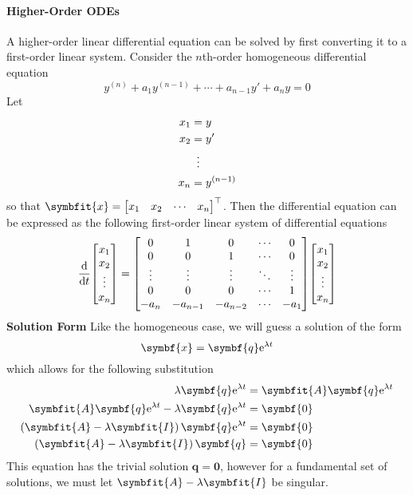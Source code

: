 \documentclass{article}
\begin{document}
\paragraph{Higher-Order ODEs}
A higher-order linear differential equation can be solved by first converting it to a first-order linear 
system. Consider the $n$th-order homogeneous differential equation
\begin{equation*}
    y^{\left( n \right)} + a_1 y^{\left( n-1 \right)} + \cdots + a_{n-1} y' + a_n y = 0
\end{equation*}
Let
\begin{align*}
    x_1 &= y \\
    x_2 &= y' \\
    &\vdotswithin{=} \\
    x_n &= y^{\left( n-1 \right)}
\end{align*}
so that $\symbfit{x}=\mqty[x_1 & x_2 & \cdots & x_n]^\top$. Then the differential equation can
be expressed as the following first-order linear system of differential equations
\begin{equation*}
    \dv{t}\mqty[
        x_1 \\
        x_2 \\
        \vdotswithin{x_3} \\
        x_n	
    ] = \mqty[
        0 & 1 & 0 & \cdots & 0 \\
        0 & 0 & 1 & \cdots & 0 \\
        \vdots & \vdots & \vdots & \ddots & \vdots \\
        0 & 0 & 0 & \cdots & 1 \\
        -a_n & -a_{n-1} & -a_{n-2} & \cdots & -a_1
    ] \mqty[
        x_1 \\
        x_2 \\
        \vdotswithin{x_3} \\
        x_n	
    ]
\end{equation*}
\textbf{Solution Form}
Like the homogeneous case, we will guess a solution of the form
\begin{equation*}
    \symbf{x} = \symbf{q}\e^{\lambda t}
\end{equation*}
which allows for the following substitution
\begin{align*}
    \lambda \symbf{q}\e^{\lambda t} &= \symbfit{A} \symbf{q}\e^{\lambda t} \\
    \symbfit{A} \symbf{q}\e^{\lambda t} - \lambda \symbf{q}\e^{\lambda t} &= \symbf{0} \\
    \left( \symbfit{A} - \lambda\symbfit{I} \right) \symbf{q}\e^{\lambda t} &= \symbf{0} \\
    \left( \symbfit{A} - \lambda\symbfit{I} \right) \symbf{q} &= \symbf{0}
\end{align*}
This equation has the trivial solution $\symbf{q}=\symbf{0}$, however for a fundamental set of solutions,
we must let $\symbfit{A} - \lambda\symbfit{I}$ be singular.
\end{document}
